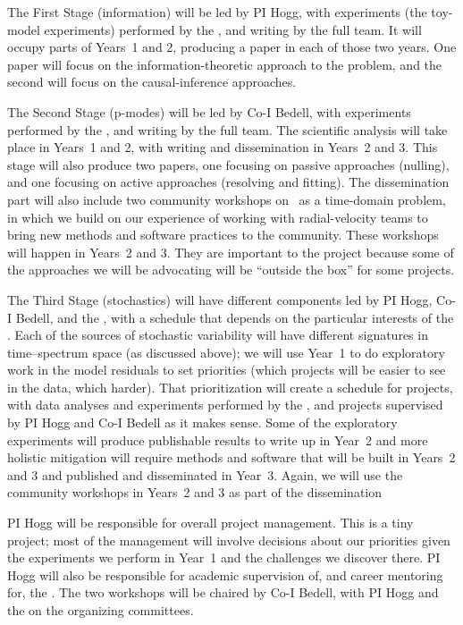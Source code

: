\documentclass[12pt, letterpaper]{article}
\begin{document}
The First Stage (information) will be led by PI Hogg, with experiments (the
toy-model experiments) performed by the \GRA, and writing by the full
team.
It will occupy parts of Years~1 and 2, producing a paper
in each of those two years.
One paper will focus on the information-theoretic approach to the problem,
and the second will focus on the causal-inference approaches.

The Second Stage (p-modes) will be led by Co-I Bedell, with
experiments performed by the \GRA, and writing by the full team.
The scientific analysis will take place in Years~1 and 2, with
writing and dissemination in Years~2 and 3.
This stage will also produce two papers, one focusing on passive
approaches (nulling), and one focusing on active approaches (resolving
and fitting).
The dissemination part will also include two community workshops on
\EPRV\ as a time-domain problem, in which we build on our experience
of working with radial-velocity teams to bring new methods and
software practices to the community.
These workshops will happen in Years~2 and 3.
They are important to the project because some of the approaches we
will be advocating will be ``outside the box'' for some projects.

The Third Stage (stochastics) will have different components led by PI
Hogg, Co-I Bedell, and the \GRA, with a schedule that depends on the
particular interests of the \GRA.
Each of the sources of stochastic variability will have different
signatures in time--spectrum space (as discussed above); we will use
Year~1 to do exploratory work in the model residuals to set priorities
(which projects will be easier to see in the data, which harder).
That prioritization will create a schedule for projects, with data
analyses and experiments performed by the \GRA, and projects supervised
by PI Hogg and Co-I Bedell as it makes sense.
Some of the exploratory experiments will produce publishable results
to write up in Year~2 and more holistic mitigation will require
methods and software that will be built in Years~2 and 3 and published
and disseminated in Year~3.
Again, we will use the community workshops in Years~2 and 3 as part of
the dissemination

PI Hogg will be responsible for overall project management. This is a
tiny project; most of the management will involve decisions about our
priorities given the experiments we perform in Year~1 and the
challenges we discover there.
PI Hogg will also be responsible for academic supervision of, and
career mentoring for, the \GRA.
The two workshops will be chaired by Co-I Bedell, with PI Hogg and
the \GRA on the organizing committees.
\end{document}

